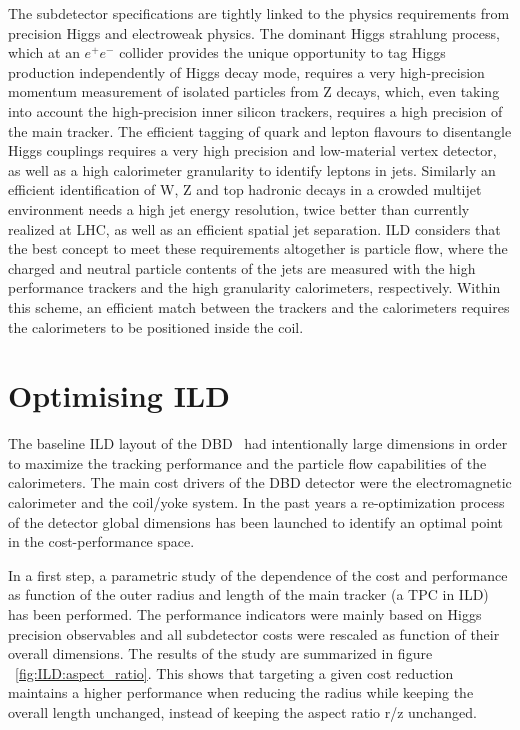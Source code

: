 The subdetector specifications are tightly linked to the physics requirements from precision Higgs and electroweak physics. The dominant Higgs strahlung process, which at an $e^+e^-$ collider provides the unique opportunity to tag Higgs production independently of Higgs decay mode, requires a very high-precision momentum measurement of isolated particles from Z decays, which, even taking into account the high-precision inner silicon trackers, requires a high precision of the main tracker. The efficient tagging of quark and lepton flavours to disentangle Higgs couplings requires a very high precision and low-material vertex detector, as well as a high calorimeter granularity to identify leptons in jets. Similarly an efficient identification of W, Z and top hadronic decays in a crowded multijet environment needs a high jet energy resolution, twice better than currently realized at LHC, as well as an efficient spatial jet separation. ILD considers that the best concept to meet these requirements altogether is particle flow, where the charged and neutral particle contents of the jets are measured with the high performance trackers and the high granularity calorimeters, respectively. Within this scheme, an efficient match between the trackers and the calorimeters requires the calorimeters to be positioned inside the coil.     



\section{Optimising ILD}

The baseline ILD layout of the DBD~\cite{ild:bib:ILDDBD} had intentionally large dimensions in order to maximize the tracking performance and the particle flow capabilities of the calorimeters. The main cost drivers of the DBD detector were the electromagnetic calorimeter and the coil/yoke system. In the past years a re-optimization process of the detector global dimensions has been launched to identify an optimal point in the cost-performance space.

In a first step, a parametric study of the dependence of the cost and performance as function of the outer radius and length of the main tracker (a TPC in ILD) has been performed. The performance indicators were mainly based on Higgs precision observables and all subdetector costs were rescaled as function of their overall dimensions. The results of the study are summarized in figure ~\ref{fig:ILD:aspect_ratio}. This shows that targeting a given cost reduction maintains a higher performance when reducing the radius while keeping the overall length unchanged, instead of keeping the aspect ratio r/z unchanged.  

